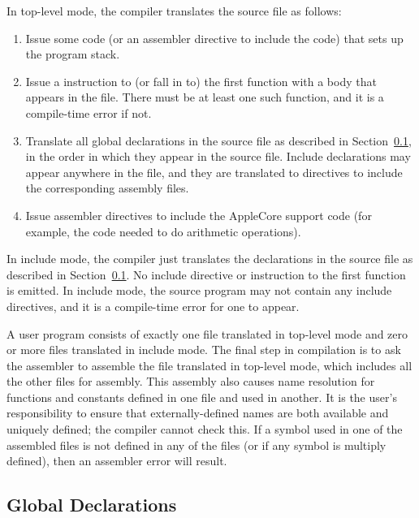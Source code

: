 \documentclass[10pt]{article}
\begin{document}
  In top-level mode, the compiler translates
the source file as follows:
%
\begin{enumerate}
%
\item Issue some code (or an assembler directive to include the code)
  that sets up the program stack.
%
\item Issue a  instruction to (or fall in to) the first
  function with a body that appears in the file.  There must be at
  least one such function, and it is a compile-time error if not.
%
\item Translate all global declarations in the source file as
  described in Section~\ref{sec:code-gen:global-decls}, in the
  order in which they appear in the source file.  Include declarations
  may appear anywhere in the file, and they are translated to
  directives to include the corresponding assembly files.
%
\item Issue assembler directives to include the AppleCore support code
  (for example, the code needed to do arithmetic operations).
%
\end{enumerate}

 In include mode, the compiler just translates
the declarations in the source file as described in
Section~\ref{sec:code-gen:global-decls}.  No include directive or
 instruction to the first function is emitted.  In include
mode, the source program may not contain any include directives, and
it is a compile-time error for one to appear.

 A user program consists
of exactly one file translated in top-level mode and zero or more
files translated in include mode.  The final step in compilation is to
ask the assembler to assemble the file translated in top-level mode,
which includes all the other files for assembly.  This assembly also
causes name resolution for functions and constants defined in one file
and used in another.  It is the user's responsibility to ensure that
externally-defined names are both available and uniquely defined; the
compiler cannot check this.  If a symbol used in one of the assembled
files is not defined in any of the files (or if any symbol is multiply
defined), then an assembler error will result.

\subsection{Global Declarations}
\label{sec:code-gen:global-decls}
\end{document}
